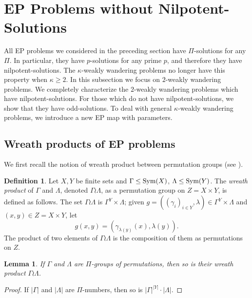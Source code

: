 \documentclass[11pt]{amsart}
\newtheorem{lemma}[theorem]{Lemma}
\theoremstyle{definition}
\newtheorem{definition}[theorem]{Definition}
\theoremstyle{definition}
\numberwithin{equation}{section}
\begin{document}
\section{EP Problems without Nilpotent-Solutions}

All EP problems we considered in the preceding section have $\Pi$-solutions for any $\Pi$. In particular, they have $p$-solutions for any prime $p$, and therefore they have nilpotent-solutions. The $\kappa$-weakly wandering problems no longer have this property when $\kappa\geq 2$. In this subsection we focus on $2$-weakly wandering problems. We completely characterize the $2$-weakly wandering problems which have nilpotent-solutions. For those which do not have nilpotent-solutions, we show that they have odd-solutions. To deal with general $\kappa$-weakly wandering problems, we introduce a new EP map with parameters.


\subsection{Wreath products of EP problems}

We first recall the notion of wreath product between permutation groups (see \cite[Section 1.10]{RobinsonBook}).

\begin{definition}\label{def:wr} Let $X, Y$ be finite sets and $\Gamma\leq \mbox{\rm Sym}(X)$, $\Lambda\leq \mbox{\rm Sym}(Y)$. The {\em wreath product} of $\Gamma$ and $\Lambda$, denoted $\Gamma\wr\Lambda$, as a permutation group on $Z=X\times Y$, is defined as follows. The set $\Gamma\wr\Lambda$ is $\Gamma^Y\times \Lambda$; given $g=((\gamma_i)_{i\in Y}, \lambda)\in \Gamma^Y\times\Lambda$ and $(x, y)\in Z=X\times Y$, let
$$ g(x, y)=(\gamma_{\lambda(y)}(x), \lambda(y)). $$
The product of two elements of $\Gamma\wr\Lambda$ is the composition of them as permutations on $Z$.
\end{definition}

\begin{lemma}\label{lem:basicwr} If $\Gamma$ and $\Lambda$ are $\Pi$-groups of permutations, then so is their wreath product $\Gamma\wr\Lambda$.
\end{lemma}

\begin{proof} If $|\Gamma|$ and $|\Lambda|$ are $\Pi$-numbers, then so is $|\Gamma|^{|Y|}\cdot|\Lambda|$.
\end{proof}
\end{document}
